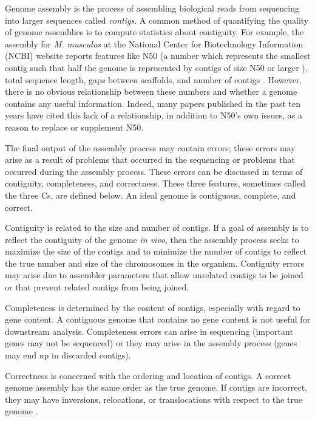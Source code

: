\documentclass[twocolumn, dvipsnames]{bmcart}%
\begin{document}
Genome assembly is the process of assembling biological reads from sequencing into larger sequences called \textit{contigs}. A common method of quantifying the quality of genome assemblies is to compute statistics about contiguity. For example, the assembly for \textit{M. musculus} at the National Center for Biotechnology Information (NCBI) website reports features like N50 (a number which represents the smallest contig such that half the genome is represented by contigs of size N50 or larger \cite{Salzberg2012, Baker2012}), total sequence length, gaps between scaffolds, and number of contigs \cite{noauthor_grcm38.p6_nodate}. However, there is no obvious relationship between these numbers and whether a genome contains any useful information. Indeed, many papers published in the past ten years have cited this lack of a relationship, in addition to N50's own issues, as a reason to replace or supplement N50.

The final output of the assembly process may contain errors; these errors may arise as a result of problems that occurred in the sequencing or problems that occurred during the assembly process. These errors can be discussed in terms of contiguity, completeness, and correctness. These three features, sometimes called the three Cs, are defined below. An ideal genome is contiguous, complete, and correct.

Contiguity is related to the size and number of contigs. If a goal of assembly is to reflect the contiguity of the genome \textit{in vivo}, then the assembly process seeks to maximize the size of the contigs and to minimize the number of contigs to reflect the true number and size of the chromosomes in the organism. Contiguity errors may arise due to assembler parameters that allow unrelated contigs to be joined or that prevent related contigs from being joined.

Completeness is determined by the content of contigs, especially with regard to gene content. A contiguous genome that contains no gene content is not useful for downstream analysis. Completeness errors can arise in sequencing (important genes may not be sequenced) or they may arise in the assembly process (genes may end up in discarded contigs).

Correctness is concerned with the ordering and location of contigs. A correct genome assembly has the same order as the true genome. If contigs are incorrect, they may have inversions, relocations, or translocations with respect to the true genome \cite{Salzberg2012}.
\end{document}
